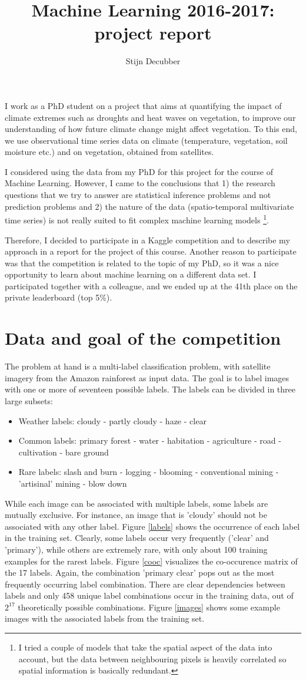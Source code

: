 \documentclass[fleqn]{homework}
\title{Machine Learning 2016-2017: project report}
\author{Stijn Decubber}
\begin{document}
I work as a PhD student on a project that aims at quantifying the impact of climate extremes such as droughts and heat waves on vegetation, to improve our understanding of how future climate change might affect vegetation. To this end, we use observational time series data on climate (temperature, vegetation, soil moisture etc.) and on vegetation, obtained from satellites. 

I considered using the data from my PhD for this project for the course of Machine Learning. However, I came to the conclusions that 1) the research questions that we try to answer are statistical inference problems and not prediction problems and 2) the nature of the data (spatio-temporal multivariate time series) is not really suited to fit complex machine learning models \footnote{I tried a couple of models that take the spatial aspect of the data into account, but the data between neighbouring pixels is heavily correlated so spatial information is basically redundant.}.

Therefore, I decided to participate in a Kaggle competition and to describe my approach in a report for the project of this course. Another reason to participate was that the competition is related to the topic of my PhD, so it was a nice opportunity to learn about machine learning on a different data set. I participated together with a colleague, and we ended up at the 41th place on the private leaderboard (top 5\%). 
\section{Data and goal of the competition}

The problem at hand is a multi-label classification problem, with satellite imagery from the Amazon rainforest as input data. The goal is to label images with one or more of seventeen possible labels. The labels can be divided in three large subsets:
\begin{itemize}
\item{Weather labels: cloudy - partly cloudy - haze - clear}
\item{Common labels: primary forest - water - habitation - agriculture - road - cultivation - bare ground}
\item{Rare labels: slash and burn - logging - blooming - conventional mining - 'artisinal' mining - blow down}
\end{itemize}

While each image can be associated with multiple labels, some labels are mutually exclusive. For instance, an image that is 'cloudy' should not be associated with any other label. Figure \ref{labels} shows the occurrence of each label in the training set. Clearly, some labels occur very frequently ('clear' and 'primary'), while others are extremely rare, with only about 100 training examples for the rarest labels. Figure \ref{cooc} visualizes the co-occurence matrix of the 17 labels. Again, the combination 'primary clear' pops out as the most frequently occurring label combination. There are clear dependencies between labels and only 458 unique label combinations occur in the training data, out of $2^{17}$ theoretically possible combinations. Figure \ref{images} shows some example images with the associated labels from the training set.
\end{document}

